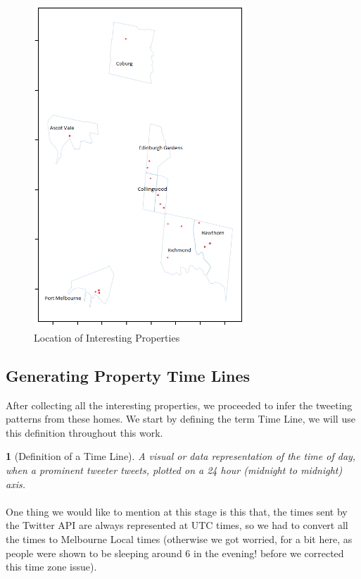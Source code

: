 \documentclass[12pt]{report}
\theoremstyle{named}
\newtheorem*{namedtheorem}{}
\begin{document}
\begin{figure}[ht]
\centering
        \includegraphics[width=80mm,scale=1]{Images/FilteredInterestingProperties.png}
    \caption{Location of Interesting Properties}
    \label{fig:Location of Interesting Properties}
\end{figure}

\subsection{Generating Property Time Lines}
After collecting all the interesting properties, we proceeded to infer the tweeting patterns from these homes. We start by defining the term Time Line, we will use this definition throughout this work.
\begin{namedtheorem}[Definition of a Time Line] A visual or data representation of the time of day, when a prominent tweeter tweets, plotted on a 24 hour (midnight to midnight) axis.

\end{namedtheorem}
\paragraph{}
One thing we would like to mention at this stage is this that, the times sent by the Twitter API are always represented at UTC times, so we had to convert all the times to Melbourne Local times (otherwise we got worried, for a bit here, as people were shown to be sleeping around 6 in the evening! before we corrected this time zone issue).
\end{document}
